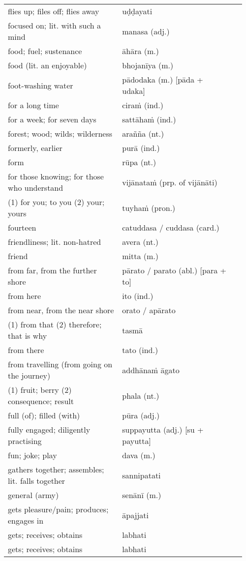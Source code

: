 \documentclass[a5paper]{memoir}
\begin{document}
\begin{longtable}{L{0.48\linewidth} L{0.48\linewidth} H}
flies up; files off; flies away & uḍḍayati & \\
focused on; lit. with such a mind & manasa (adj.) & \\
food; fuel; sustenance & āhāra (m.) & \\
food (lit. an enjoyable) & bhojanīya (m.) & \\
foot-washing water & pādodaka (m.) [pāda + udaka] & \\
for a long time & ciraṁ (ind.) & \\
for a week; for seven days & sattāhaṁ (ind.) & \\
forest; wood; wilds; wilderness & arañña (nt.) & \\
formerly, earlier & purā (ind.) & \\
form & rūpa (nt.) & \\
for those knowing; for those who understand & vijānataṁ (prp. of vijānāti) & \\
(1) for you; to you (2) your; yours & tuyhaṁ (pron.) & \\
fourteen & catuddasa / cuddasa (card.) & \\
friendliness; lit. non-hatred & avera (nt.) & \\
friend & mitta (m.) & \\
from far, from the further shore & pārato / parato (abl.) [para + to] & \\
from here & ito (ind.) & \\
from near, from the near shore & orato / apārato & \\
(1) from that (2) therefore; that is why & tasmā & \\
from there & tato (ind.) & \\
from travelling (from going on the journey) & addhānaṁ āgato & \\
(1) fruit; berry (2) consequence; result & phala (nt.) & \\
full (of); filled (with) & pūra (adj.) & \\
fully engaged; diligently practising & suppayutta (adj.) [su + payutta] & \\
fun; joke; play & dava (m.) & \\
gathers together; assembles; lit. falls together & sannipatati & \\
general (army) & senānī (m.) & \\
gets pleasure/pain; produces; engages in & āpajjati & \\
gets; receives; obtains & labhati & \\
gets; receives; obtains & labhati & \\

\end{longtable}
\end{document}
